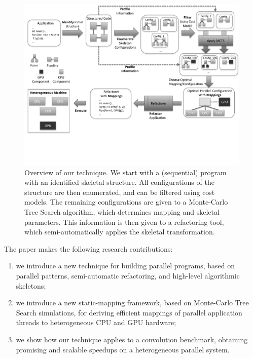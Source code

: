 \documentclass[smallextended]{svjour3}
\begin{document}
\begin{figure}[t]
\begin{center}
\includegraphics[width=0.99\linewidth]{figures/methodology.pdf}
\caption{Overview of our technique.  We start with a (sequential)
  program with an identified skeletal structure. All configurations of the
  structure are then enumerated, and can be filtered using cost
  models. The remaining configurations are given to a Monte-Carlo Tree
  Search algorithm, which determines mapping and skeletal parameters. 
  This information is then given to a
  refactoring tool, which semi-automatically applies the skeletal
  transformation. } %
\label{overview}
\end{center}
\end{figure}

The paper makes the following research contributions:
\begin{enumerate}
\item we introduce a new technique for building
  parallel programs, based on parallel patterns, semi-automatic refactoring, and high-level algorithmic skeletons;
\item we introduce a new static-mapping framework, based on Monte-Carlo Tree Search simulations, for deriving
  efficient mappings of parallel application threads to heterogeneous CPU
  and GPU hardware;
\item 
we show how our technique applies to a convolution benchmark,
  obtaining promising and scalable speedups on a heterogeneous parallel
  system.
\end{enumerate}
\end{document}
